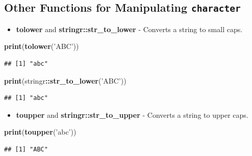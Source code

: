 \documentclass[11pt,]{book}
\newenvironment{Shaded}{\begin{snugshade}}{\end{snugshade}}
\newcommand{\KeywordTok}[1]{\textcolor[rgb]{0.27,0.27,0.27}{\textbf{#1}}}
\newcommand{\StringTok}[1]{\textcolor[rgb]{0.5,0.5,0.5}{#1}}
\newcommand{\OperatorTok}[1]{\textcolor[rgb]{0.81,0.36,0.00}{\textbf{#1}}}
\newcommand{\NormalTok}[1]{#1}
\providecommand{\tightlist}{%
  \setlength{\itemsep}{0pt}\setlength{\parskip}{0pt}}
\begin{document}
\subsection{\texorpdfstring{Other Functions for Manipulating
\texttt{character}}{Other Functions for Manipulating character}}\label{other-functions-for-manipulating-character}

\begin{itemize}
\tightlist
\item
  \textbf{tolower} and \textbf{stringr::str\_to\_lower} - Converts a
  string to small caps.
\end{itemize}

\begin{Shaded}
\begin{Highlighting}[]
\KeywordTok{print}\NormalTok{(}\KeywordTok{tolower}\NormalTok{(}\StringTok{'ABC'}\NormalTok{))}
\end{Highlighting}
\end{Shaded}

\begin{verbatim}
## [1] "abc"
\end{verbatim}

\begin{Shaded}
\begin{Highlighting}[]
\KeywordTok{print}\NormalTok{(stringr}\OperatorTok{::}\KeywordTok{str_to_lower}\NormalTok{(}\StringTok{'ABC'}\NormalTok{))}
\end{Highlighting}
\end{Shaded}

\begin{verbatim}
## [1] "abc"
\end{verbatim}

\begin{itemize}
\tightlist
\item
  \textbf{toupper} and \textbf{stringr::str\_to\_upper} - Converts a
  string to upper caps.
\end{itemize}

\begin{Shaded}
\begin{Highlighting}[]
\KeywordTok{print}\NormalTok{(}\KeywordTok{toupper}\NormalTok{(}\StringTok{'abc'}\NormalTok{))}
\end{Highlighting}
\end{Shaded}

\begin{verbatim}
## [1] "ABC"
\end{verbatim}
\end{document}
